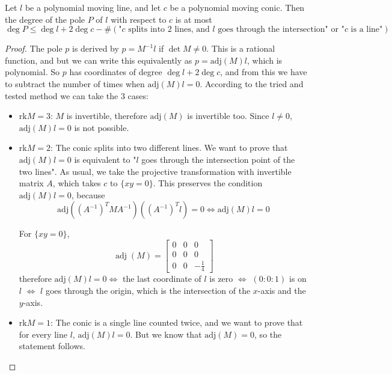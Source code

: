 \documentclass[a4paper]{article}
\begin{document}
\begin{theorem}
    Let $l$ be a polynomial moving line, and let $c$ be a polynomial moving conic. Then the degree of the pole $P$ of $l$ with respect to $c$ is at most
    $$\deg P\le\deg l +2\deg c - \#(\text{"$c$ splits into 2 lines, and $l$ goes through the intersection" or "$c$ is a line"})$$
\end{theorem}
\begin{proof}
    The pole $p$ is derived by $p=M^{-1} l$ if $\det M\ne 0$. This is a rational function, and but we can write this equivalently as $p=\mathrm{adj}(M) l$, which is polynomial. So $p$ has coordinates of degree $\deg l +2\deg c$, and from this we have to subtract the number of times when $\mathrm{adj}(M) l=0$. According to the tried and tested method we can take the 3 cases:
    \begin{itemize}
    \item $\mathrm{rk}M=3$: $M$ is invertible, therefore $\mathrm{adj}(M)$ is invertible too. Since $l\ne 0$, $\mathrm{adj}(M)l=0$ is not possible.
    \item $\mathrm{rk}M=2$: The conic splits into two different lines. We want to prove that $\mathrm{adj}(M)l=0$ is equivalent to "$l$ goes through the intersection point of the two lines". As usual, we take the projective transformation with invertible matrix $A$, which takes $c$ to $\{xy=0\}$. This preserves the condition $\mathrm{adj}(M)l=0$, because
    $$\mathrm{adj}((A^{-1})^TMA^{-1})((A^{-1})^Tl)=0 \iff \mathrm{adj}(M)l=0$$

    For $\{xy=0\}$,
    $$\operatorname{adj}(M) =
    \begin{bmatrix}
    0 & 0 & 0\\[4pt]
    0 & 0 & 0\\[4pt]
    0 & 0 & -\tfrac{1}{4}
    \end{bmatrix}$$
therefore $\mathrm{adj}(M)l=0\iff$ the last coordinate of $l$ is zero $\iff$ $(0:0:1)$ is on $l$ $\iff$ $l$ goes through the origin, which is the intersection of the $x$-axis and the $y$-axis.
    \item $\mathrm{rk}M=1$: The conic is a single line counted twice, and we want to prove that for every line $l$, $\mathrm{adj}(M) l=0$. But we know that $\mathrm{adj}(M)=0$, so the statement follows.
\end{itemize}
\end{proof}
\end{document}
